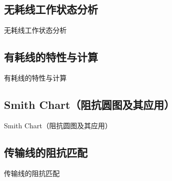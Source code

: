 \subsection{无耗线工作状态分析}
\begin{frame}{无耗线工作状态分析}

\end{frame}

\subsection{有耗线的特性与计算}
\begin{frame}{有耗线的特性与计算}

\end{frame}

\subsection{Smith Chart（阻抗圆图及其应用）}
\begin{frame}{Smith Chart（阻抗圆图及其应用）}

\end{frame}

\subsection{传输线的阻抗匹配}
\begin{frame}{传输线的阻抗匹配}

\end{frame}
